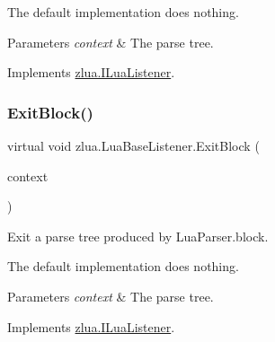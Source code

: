The default implementation does nothing.


\begin{DoxyParams}{Parameters}
{\em context} & The parse tree.\\
\hline
\end{DoxyParams}


Implements \mbox{\hyperlink{interfacezlua_1_1_i_lua_listener_ad3a0df056fe6b0c23d11cad89f6091c7}{zlua.\+I\+Lua\+Listener}}.

\mbox{\label{classzlua_1_1_lua_base_listener_a8d6e54dc1618ec3c8fdcc8ccea015a4f}} 
\subsubsection{\texorpdfstring{Exit\+Block()}{ExitBlock()}}
{\footnotesize\ttfamily virtual void zlua.\+Lua\+Base\+Listener.\+Exit\+Block (\begin{DoxyParamCaption}\item[{\mbox{[}\+Not\+Null\mbox{]} \mbox{\hyperlink{classzlua_1_1_lua_parser_1_1_block_context}{Lua\+Parser.\+Block\+Context}}}]{context }\end{DoxyParamCaption})\hspace{0.3cm}{\ttfamily [virtual]}}



Exit a parse tree produced by Lua\+Parser.\+block. 

The default implementation does nothing.


\begin{DoxyParams}{Parameters}
{\em context} & The parse tree.\\
\hline
\end{DoxyParams}


Implements \mbox{\hyperlink{interfacezlua_1_1_i_lua_listener_aa934019f5871ef882e345518906753b7}{zlua.\+I\+Lua\+Listener}}.

\mbox{\label{classzlua_1_1_lua_base_listener_ac0f699c3a181d8236218792a69955d0d}} 
